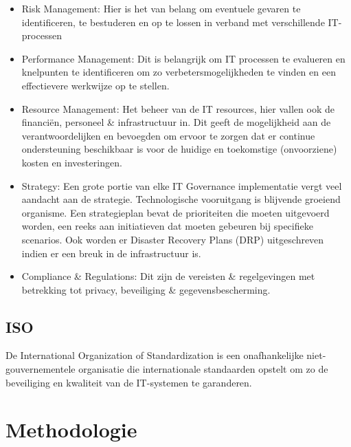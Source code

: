 \begin{itemize}
  \item Risk Management:
  Hier is het van belang om eventuele gevaren te identificeren, te bestuderen en op te lossen in verband met verschillende IT-processen
  \item Performance Management:
  Dit is belangrijk om IT processen te evalueren en knelpunten te identificeren om zo verbetersmogelijkheden te vinden en een effectievere werkwijze op te stellen.
  \item Resource Management:
  Het beheer van de IT resources, hier vallen ook de financiën, personeel \& infrastructuur in. Dit geeft de mogelijkheid aan de verantwoordelijken en bevoegden om ervoor te zorgen dat er continue ondersteuning beschikbaar is voor de huidige en toekomstige (onvoorziene) kosten en investeringen.
  \item Strategy:
  Een grote portie van elke IT Governance implementatie vergt veel aandacht aan de strategie. Technologische vooruitgang is blijvende groeiend organisme. Een strategieplan bevat de prioriteiten die moeten uitgevoerd worden, een reeks aan initiatieven dat moeten gebeuren bij specifieke scenarios. Ook worden er Disaster Recovery Plans (DRP) uitgeschreven indien er een breuk in de infrastructuur is.
  \item Compliance \& Regulations:
  Dit zijn de vereisten \& regelgevingen met betrekking tot privacy, beveiliging \& gegevensbescherming.
\end{itemize}

\subsection{ISO}
De International Organization of Standardization is een onafhankelijke niet-gouvernementele organisatie die internationale standaarden opstelt om zo de beveiliging en kwaliteit van de IT-systemen te garanderen.







\section{Methodologie}%
\label{sec:methodologie}

